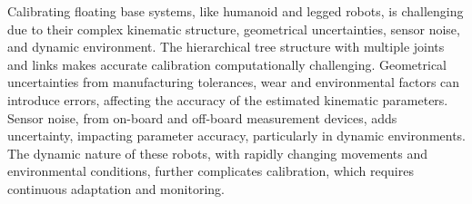 
Calibrating floating base systems, like humanoid and legged robots, is challenging due to their complex kinematic structure, geometrical uncertainties, sensor noise, and dynamic environment. The hierarchical tree structure with multiple joints and links makes accurate calibration computationally challenging. Geometrical uncertainties from manufacturing tolerances, wear and environmental factors can introduce errors, affecting the accuracy of the estimated kinematic parameters. Sensor noise, from on-board and off-board measurement devices, adds uncertainty, impacting parameter accuracy, particularly in dynamic environments. The dynamic nature of these robots, with rapidly changing movements and environmental conditions, further complicates calibration, which requires continuous adaptation and monitoring.

